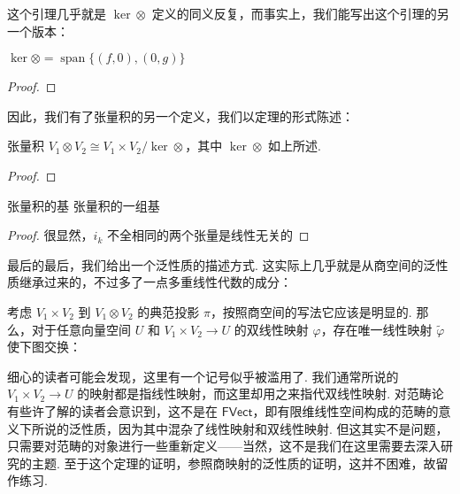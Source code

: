 这个引理几乎就是 $\ker \otimes$ 定义的同义反复，而事实上，我们能写出这个引理的另一个版本：

\begin{lemma}{}{}
    $\ker \otimes = \mathop{\mathrm{span}}\{(f,0), (0, g)\}$
\end{lemma}
\begin{proof}

\end{proof}

因此，我们有了张量积的另一个定义，我们以定理的形式陈述：

\begin{theorem}{}{}
    张量积 $V_1 \otimes V_2 \cong V_1 \times V_2 / \ker \otimes$，其中 $\ker \otimes$ 如上所述.
\end{theorem}
\begin{proof}

\end{proof}

\begin{theorem}{}{张量积的基}
    张量积的一组基
\end{theorem}
\begin{proof}
    很显然，$i_k$ 不全相同的两个张量是线性无关的
\end{proof}

最后的最后，我们给出一个泛性质的描述方式. 这实际上几乎就是从商空间的泛性质继承过来的，不过多了一点多重线性代数的成分：

\begin{theorem}{}{}
    考虑 $V_1 \times V_2$ 到 $V_1 \otimes V_2$ 的典范投影 $\pi$，按照商空间的写法它应该是明显的. 那么，对于任意向量空间 $U$ 和 $V_1 \times V_2 \to U$ 的双线性映射 $\varphi$，存在唯一线性映射 $\tilde \varphi$ 使下图交换：
    \begin{center}
    \end{center}
\end{theorem}

细心的读者可能会发现，这里有一个记号似乎被滥用了. 我们通常所说的 $V_1 \times V_2 \to U$ 的映射都是指线性映射，而这里却用之来指代双线性映射. 对范畴论有些许了解的读者会意识到，这不是在 $\mathsf{FVect}$，即有限维线性空间构成的范畴的意义下所说的泛性质，因为其中混杂了线性映射和双线性映射. 但这其实不是问题，只需要对范畴的对象进行一些重新定义——当然，这不是我们在这里需要去深入研究的主题. 至于这个定理的证明，参照商映射的泛性质的证明，这并不困难，故留作练习.

